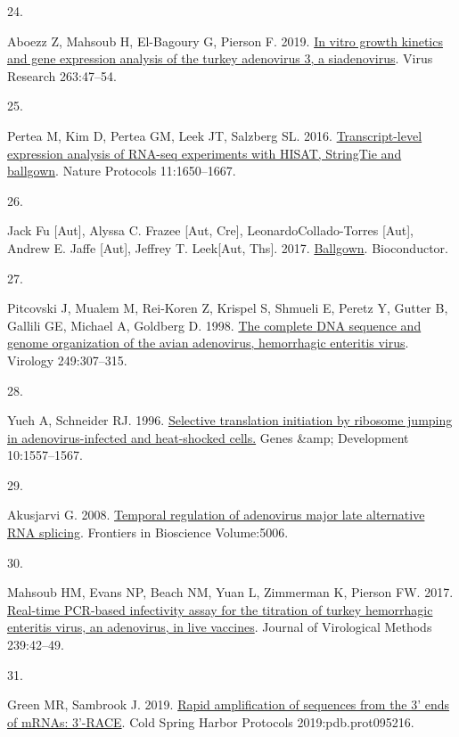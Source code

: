 \documentclass[
]{article}
\newlength{\cslhangindent}
\newlength{\csllabelwidth}
\newenvironment{CSLReferences}[2] %
 {\begin{list}{}{%
  \setlength{\itemindent}{0pt}
  \setlength{\leftmargin}{0pt}
  \setlength{\parsep}{0pt}
  \ifodd #1
   \setlength{\leftmargin}{\cslhangindent}
   \setlength{\itemindent}{-1\cslhangindent}
  \fi
  \setlength{\itemsep}{#2\baselineskip}}}
 {\end{list}}
\newcommand{\CSLLeftMargin}[1]{\parbox[t]{\csllabelwidth}{\strut#1\strut}}
\newcommand{\CSLRightInline}[1]{\parbox[t]{\linewidth - \csllabelwidth}{\strut#1\strut}}
\begin{document}
\begin{CSLReferences}{0}{1}
\CSLLeftMargin{24. }%
\CSLRightInline{Aboezz Z, Mahsoub H, El-Bagoury G, Pierson F. 2019.
\href{https://www.sciencedirect.com/science/article/abs/pii/S016817021830529X?via\%3Dihub}{In
vitro growth kinetics and gene expression analysis of the turkey
adenovirus 3, a siadenovirus}. Virus Research 263:47--54.}

\CSLLeftMargin{25. }%
\CSLRightInline{Pertea M, Kim D, Pertea GM, Leek JT, Salzberg SL. 2016.
\href{https://doi.org/10.1038/nprot.2016.095}{Transcript-level
expression analysis of RNA-seq experiments with HISAT, StringTie and
ballgown}. Nature Protocols 11:1650--1667.}

\CSLLeftMargin{26. }%
\CSLRightInline{Jack Fu {[}Aut{]}, Alyssa C. Frazee {[}Aut, Cre{]},
LeonardoCollado-Torres {[}Aut{]}, Andrew E. Jaffe {[}Aut{]}, Jeffrey T.
Leek{[}Aut, Ths{]}. 2017.
\href{https://doi.org/10.18129/B9.BIOC.BALLGOWN}{Ballgown}.
Bioconductor.}

\CSLLeftMargin{27. }%
\CSLRightInline{Pitcovski J, Mualem M, Rei-Koren Z, Krispel S, Shmueli
E, Peretz Y, Gutter B, Gallili GE, Michael A, Goldberg D. 1998.
\href{https://doi.org/10.1006/viro.1998.9336}{The complete {DNA}
sequence and genome organization of the avian adenovirus, hemorrhagic
enteritis virus}. Virology 249:307--315.}

\CSLLeftMargin{28. }%
\CSLRightInline{Yueh A, Schneider RJ. 1996.
\href{https://doi.org/10.1101/gad.10.12.1557}{Selective translation
initiation by ribosome jumping in adenovirus-infected and heat-shocked
cells.} Genes \&amp; Development 10:1557--1567.}

\CSLLeftMargin{29. }%
\CSLRightInline{Akusjarvi G. 2008.
\href{https://doi.org/10.2741/3059}{Temporal regulation of adenovirus
major late alternative RNA splicing}. Frontiers in Bioscience
Volume:5006.}

\CSLLeftMargin{30. }%
\CSLRightInline{Mahsoub HM, Evans NP, Beach NM, Yuan L, Zimmerman K,
Pierson FW. 2017.
\href{https://doi.org/10.1016/j.jviromet.2016.11.002}{Real-time
{PCR}-based infectivity assay for the titration of turkey hemorrhagic
enteritis virus, an adenovirus, in live vaccines}. Journal of
Virological Methods 239:42--49.}

\CSLLeftMargin{31. }%
\CSLRightInline{Green MR, Sambrook J. 2019.
\href{https://doi.org/10.1101/pdb.prot095216}{Rapid amplification of
sequences from the 3' ends of mRNAs: 3'-RACE}. Cold Spring Harbor
Protocols 2019:pdb.prot095216.}


\end{CSLReferences}
\end{document}
